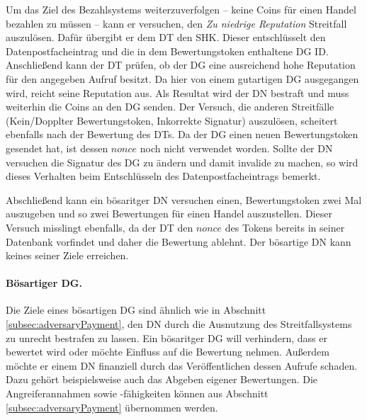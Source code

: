 \documentclass[
	fontsize=11pt,
	headings=small,
	parskip=half,           %
	bibliography=totoc,
	numbers=noenddot,       %
	open=any,               %
]{scrreprt}
\begin{document}
Um das Ziel des Bezahlsystems weiterzuverfolgen -- keine Coins für einen Handel bezahlen zu müssen -- kann er versuchen, den \textit{Zu niedrige Reputation} Streitfall auszulösen. Dafür übergibt er dem DT den SHK. Dieser entschlüsselt den Datenpostfacheintrag und die in dem Bewertungstoken enthaltene DG ID. Anschließend kann der DT prüfen, ob der DG eine ausreichend hohe Reputation für den angegeben Aufruf besitzt. Da hier von einem gutartigen DG ausgegangen wird, reicht seine Reputation aus. Als Resultat wird der DN bestraft und muss weiterhin die Coins an den DG senden. Der Versuch, die anderen Streitfälle (Kein/Dopplter Bewertungstoken, Inkorrekte Signatur) auszulösen, scheitert ebenfalls nach der Bewertung des DTs. Da der DG einen neuen Bewertungstoken gesendet hat, ist dessen $nonce$ noch nicht verwendet worden. Sollte der DN versuchen die Signatur des DG zu ändern und damit invalide zu machen, so wird dieses Verhalten beim Entschlüsseln des Datenpostfacheintrags bemerkt.

Abschließend kann ein bösaritger DN versuchen einen, Bewertungstoken zwei Mal auszugeben und so zwei Bewertungen für einen Handel auszustellen. Dieser Versuch misslingt ebenfalls, da der DT den $nonce$ des Tokens bereits in seiner Datenbank vorfindet und daher die Bewertung ablehnt. Der bösartige DN kann keines seiner Ziele erreichen.

\paragraph{Bösartiger DG.}
Die Ziele eines bösartigen DG sind ähnlich wie in Abschnitt \ref{subsec:adversaryPayment}, den DN durch die Ausnutzung des Streitfallsystems zu unrecht bestrafen zu lassen. Ein bösaritger DG will verhindern, dass er bewertet wird oder möchte Einfluss auf die Bewertung nehmen. Außerdem möchte er einem DN finanziell durch das Veröffentlichen dessen Aufrufe schaden. Dazu gehört beispielsweise auch das Abgeben eigener Bewertungen. Die Angreiferannahmen sowie -fähigkeiten können aus Abschnitt \ref{subsec:adversaryPayment} übernommen werden.
\end{document}
